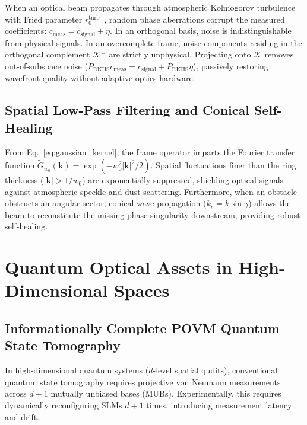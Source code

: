 \documentclass{optica-article}
\begin{document}
When an optical beam propagates through atmospheric Kolmogorov turbulence with Fried parameter $r_0^{\text{turb}}$~\cite{Fried1966,Kolmogorov1941}, random phase aberrations corrupt the measured coefficients: $c_{\text{meas}} = c_{\text{signal}} + \eta$. In an orthogonal basis, noise is indistinguishable from physical signals. In an overcomplete frame, noise components residing in the orthogonal complement $\mathcal{K}^\perp$ are strictly unphysical. Projecting onto $\mathcal{K}$ removes out-of-subspace noise ($P_{\text{RKHS}} c_{\text{meas}} = c_{\text{signal}} + P_{\text{RKHS}} \eta$), passively restoring wavefront quality without adaptive optics hardware.

\subsection{Spatial Low-Pass Filtering and Conical Self-Healing}

From Eq.~\eqref{eq:gaussian_kernel}, the frame operator imparts the Fourier transfer function $\widetilde{G}_{w_0}(\mathbf{k}) = \exp(-w_0^2 |\mathbf{k}|^2 / 2)$. Spatial fluctuations finer than the ring thickness ($|\mathbf{k}| > 1/w_0$) are exponentially suppressed, shielding optical signals against atmospheric speckle and dust scattering. Furthermore, when an obstacle obstructs an angular sector, conical wave propagation ($k_r = k \sin\gamma$) allows the beam to reconstitute the missing phase singularity downstream, providing robust self-healing.

\section{Quantum Optical Assets in High-Dimensional Spaces}
\label{sec:quantum_assets}

\subsection{Informationally Complete POVM Quantum State Tomography}

In high-dimensional quantum systems ($d$-level spatial qudits), conventional quantum state tomography requires projective von Neumann measurements across $d+1$ mutually unbiased bases (MUBs). Experimentally, this requires dynamically reconfiguring SLMs $d+1$ times, introducing measurement latency and drift.
\end{document}
